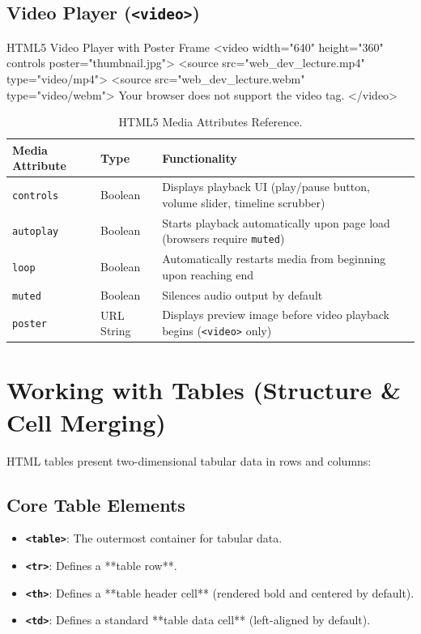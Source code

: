 \subsection{Video Player (\texttt{<video>})}
\begin{htmlcode}{HTML5 Video Player with Poster Frame}
<video width="640" height="360" controls poster="thumbnail.jpg">
    <source src="web_dev_lecture.mp4" type="video/mp4">
    <source src="web_dev_lecture.webm" type="video/webm">
    Your browser does not support the video tag.
</video>
\end{htmlcode}

\begin{table}[htbp]
\centering
\small
\renewcommand{\arraystretch}{1.3}
\begin{tabularx}{\linewidth}{ll>{\raggedright\arraybackslash}X}
\toprule
\textbf{Media Attribute} & \textbf{Type} & \textbf{Functionality} \\
\midrule
\texttt{controls} & Boolean & Displays playback UI (play/pause button, volume slider, timeline scrubber) \\
\texttt{autoplay} & Boolean & Starts playback automatically upon page load (browsers require \texttt{muted}) \\
\texttt{loop} & Boolean & Automatically restarts media from beginning upon reaching end \\
\texttt{muted} & Boolean & Silences audio output by default \\
\texttt{poster} & URL String & Displays preview image before video playback begins (\texttt{<video>} only) \\
\bottomrule
\end{tabularx}
\caption{HTML5 Media Attributes Reference.}
\label{tab:media-attributes}
\end{table}

\section{Working with Tables (Structure \& Cell Merging)}

HTML tables present two-dimensional tabular data in rows and columns:

\subsection{Core Table Elements}
\begin{itemize}[leftmargin=1.5em]
    \item \textbf{\texttt{<table>}}: The outermost container for tabular data.
    \item \textbf{\texttt{<tr>}}: Defines a **table row**.
    \item \textbf{\texttt{<th>}}: Defines a **table header cell** (rendered bold and centered by default).
    \item \textbf{\texttt{<td>}}: Defines a standard **table data cell** (left-aligned by default).
\end{itemize}

